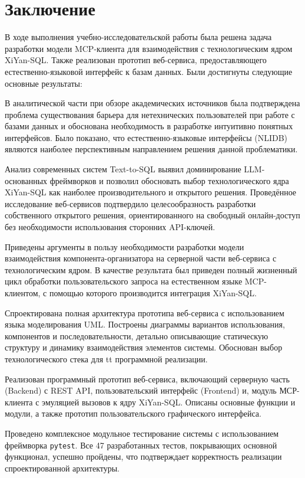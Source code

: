 \chapter*{Заключение}

В ходе выполнения учебно-исследовательской работы была решена задача разработки модели
MCP-клиента для взаимодействия с технологическим ядром XiYan-SQL.
Также реализован прототип веб-сервиса, предоставляющего естественно-языковой интерфейс к
базам данных. Были достигнуты следующие основные результаты:

\begin{compactitem}
      \item В аналитической части при обзоре академических источников
      была подтверждена проблема существования барьера для нетехнических пользователей при работе с базами данных и обоснована необходимость в разработке интуитивно понятных интерфейсов. Было показано, что естественно-языковые интерфейсы (NLIDB) являются наиболее перспективным направлением решения данной проблематики.
      \item Анализ современных систем Text-to-SQL выявил доминирование LLM-основанных фреймворков и позволил обосновать выбор технологического ядра XiYan-SQL как наиболее производительного и открытого решения. Проведённое исследование веб-сервисов подтвердило целесообразность разработки собственного открытого решения, ориентированного на свободный онлайн-доступ без необходимости использования сторонних API-ключей.
      \item Приведены аргументы в пользу необходимости разработки модели взаимодействия
      компонента-организатора на серверной части веб-сервиса с технологическим ядром.
      В качестве результата был приведен полный жизненный цикл
      обработки пользовательского запроса на естественном языке
      MCP-клиентом, с помощью которого производится интеграция XiYan-SQL.
      \item Спроектирована полная архитектура прототипа веб-сервиса с использованием языка моделирования UML. Построены диаграммы вариантов использования, компонентов и последовательности, детально описывающие статическую структуру и динамику взаимодействия элементов системы. Обоснован выбор технологического стека для tt программной реализации.
      \item Реализован программный прототип веб-сервиса, включающий серверную часть (Backend) с REST API, пользовательский интерфейс (Frontend) и, модуль МСР-клиента с эмуляцией вызовов к ядру XiYan-SQL. Описаны основные функции и модули, а также
      прототип пользовательского графического интерфейса.
      \item Проведено комплексное модульное тестирование системы с использованием фреймворка \verb|pytest|. Все 47 разработанных тестов, покрывающих основной функционал, успешно пройдены, что подтверждает корректность реализации спроектированной архитектуры.
\end{compactitem}

